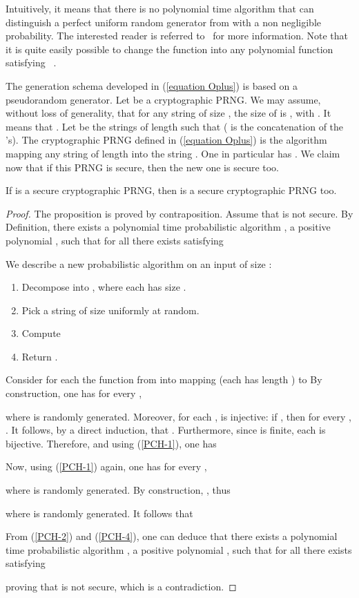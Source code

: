 \documentclass{article}
\begin{document}
Intuitively, it means that there is no polynomial time algorithm that can
distinguish a perfect uniform random generator from  with a non
negligible probability. The interested reader is referred
to~\cite[chapter~3]{Goldreich} for more information. Note that it is
quite easily possible to change the function  into any polynomial
function  satisfying ~\cite[Chapter 3.3]{Goldreich}.

The generation schema developed in (\ref{equation Oplus}) is based on a
pseudorandom generator. Let  be a cryptographic PRNG. We may assume,
without loss of generality, that for any string  of size , the size
of  is , with . It means that . 
Let  be the 
strings of length  such that  ( is the concatenation of
the 's). The cryptographic PRNG  defined in (\ref{equation Oplus})
is the algorithm mapping any string of length   into the string
. One in particular has . 
We claim now that if this PRNG is secure,
then the new one is secure too.

\begin{proposition}
\label{cryptopreuve}
If  is a secure cryptographic PRNG, then  is a secure cryptographic
PRNG too.
\end{proposition}

\begin{proof}
The proposition is proved by contraposition. Assume that  is not
secure. By Definition, there exists a polynomial time probabilistic
algorithm , a positive polynomial , such that for all  there exists
 satisfying 

We describe a new probabilistic algorithm  on an input  of size
:
\begin{enumerate}
\item Decompose  into , where each  has size .
\item Pick a string  of size  uniformly at random.
\item Compute 
\item Return .
\end{enumerate}


Consider  for each  the function 
from  into  mapping 
(each  has length ) to 
 By construction, one has for every ,

where  is randomly generated. 
Moreover, for each ,  is injective: if 
, then for every ,
. It follows,
by a direct induction, that . Furthermore, since 
is finite, each  is bijective. Therefore, and using (\ref{PCH-1}),
one has


Now, using (\ref{PCH-1}) again, one has  for every ,

where  is randomly generated. By construction, ,
thus

where  is randomly generated. 
It follows that 


 From (\ref{PCH-2}) and (\ref{PCH-4}), one can deduce that
there exists a polynomial time probabilistic
algorithm , a positive polynomial , such that for all  there exists
 satisfying 

proving that  is not secure, which is a contradiction. 
\end{proof}
\end{document}
